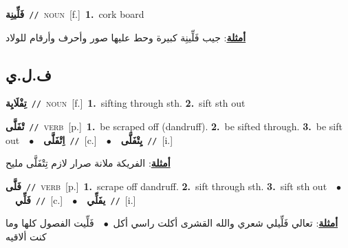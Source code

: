 \documentclass[10pt,a4paper,twoside]{article} %
\begin{document}
\begin{multicols}{2}
{\setlength\topsep{0pt}\textbf{\foreignlanguage{arabic}{فَلِّينِة}}\ {\color{gray}\texttt{//}\color{black}}\ \textsc{noun}\ [f.]\ \textbf{1.}~cork board\  \begin{flushright}\color{gray}\foreignlanguage{arabic}{\textbf{\underline{\foreignlanguage{arabic}{أمثلة}}}: جيب فَلِّينِة كبيرة وحط عليها صور وأحرف وأرقام للولاد}\end{flushright}\color{black}} \vspace{2mm}

\vspace{-3mm}
\subsection*{\color{blue}\foreignlanguage{arabic}{ف.ل.ي}\color{blue}{}} 

{\setlength\topsep{0pt}\textbf{\foreignlanguage{arabic}{تِفْلَايِة}}\ {\color{gray}\texttt{//}\color{black}}\ \textsc{noun}\ [f.]\ \textbf{1.}~sifting through sth.  \textbf{2.}~sift sth out\ } \vspace{2mm}

{\setlength\topsep{0pt}\textbf{\foreignlanguage{arabic}{تْفَلَّى}}\ {\color{gray}\texttt{//}\color{black}}\ \textsc{verb}\ [p.]\ \textbf{1.}~be scraped off (dandruff).  \textbf{2.}~be sifted through.  \textbf{3.}~be sift out\ \ $\bullet$\ \ \setlength\topsep{0pt}\textbf{\foreignlanguage{arabic}{اِتْفَلَّى}}\ {\color{gray}\texttt{//}\color{black}}\ [c.]\ \ $\bullet$\ \ \setlength\topsep{0pt}\textbf{\foreignlanguage{arabic}{يِتْفَلَّى}}\ {\color{gray}\texttt{//}\color{black}}\ [i.]\  \begin{flushright}\color{gray}\foreignlanguage{arabic}{\textbf{\underline{\foreignlanguage{arabic}{أمثلة}}}: الفريكة ملانة صرار لازم تِتْفَلَّى مليح}\end{flushright}\color{black}} \vspace{2mm}

{\setlength\topsep{0pt}\textbf{\foreignlanguage{arabic}{فَلَّى}}\ {\color{gray}\texttt{//}\color{black}}\ \textsc{verb}\ [p.]\ \textbf{1.}~scrape off dandruff.  \textbf{2.}~sift through sth.  \textbf{3.}~sift sth out\ \ $\bullet$\ \ \setlength\topsep{0pt}\textbf{\foreignlanguage{arabic}{فَلِّي}}\ {\color{gray}\texttt{//}\color{black}}\ [c.]\ \ $\bullet$\ \ \setlength\topsep{0pt}\textbf{\foreignlanguage{arabic}{يفَلِّي}}\ {\color{gray}\texttt{//}\color{black}}\ [i.]\  \begin{flushright}\color{gray}\foreignlanguage{arabic}{\textbf{\underline{\foreignlanguage{arabic}{أمثلة}}}: تعالي فَلِّيلي شعري والله القشرى أكلت راسي أكل\ $\bullet$\ \  فَلِّيت الفصول كلها وما كنت ألاقيه}\end{flushright}\color{black}} \vspace{2mm}


\end{multicols}
\end{document}
